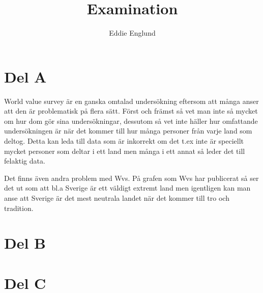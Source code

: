 \documentclass[12pt]{article}
\title{Examination}
\author{Eddie Englund}
\begin{document}
    
    \maketitle

    \section{Del A}\label{a}

    World value survey är en ganska omtalad undersökning eftersom att många anser att den är problematisk på flera sätt. Först och främst så vet man inte så mycket om hur dom gör sina undersökningar, dessutom så vet inte häller hur omfattande undersökningen är när det kommer till hur många personer från varje land som deltog. Detta kan leda till data som är inkorrekt om det t.ex inte är speciellt mycket personer som deltar i ett land men många i ett annat så leder det till felaktig data.

    Det finns även andra problem med Wvs. På grafen som Wvs har publicerat så ser det ut som att bl.a Sverige är ett väldigt extremt land men igentligen kan man anse att Sverige är det mest neutrala landet när det kommer till tro och tradition.

    \section{Del B}\label{b}
    \section{Del C}\label{c}
\end{document}
